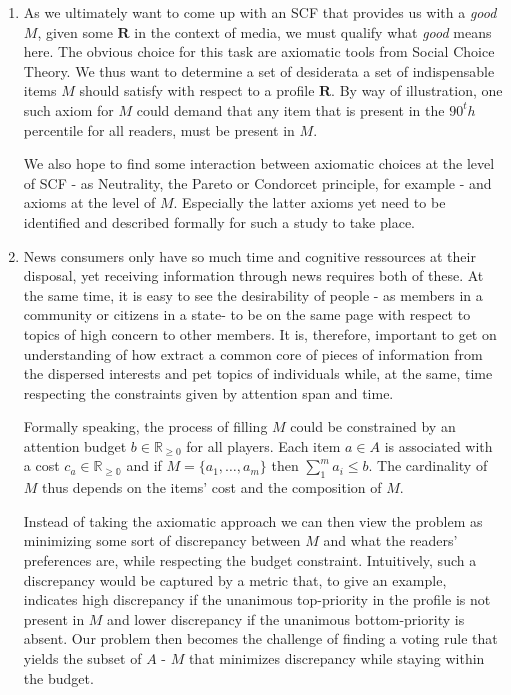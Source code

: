 \documentclass[10pt,a4paper, english]{article}
\begin{document}
\begin{enumerate}
\item As we ultimately want to come up with an SCF that provides us with a \textit{good} $M$, given some $\mathbf{R}$ in the context of media, we must qualify what \textit{good} means here. The obvious choice for this task are axiomatic tools from Social Choice Theory. We thus want to determine a set of desiderata a set of indispensable items $M$ should satisfy with respect to a profile $\mathbf{R}$. By way of illustration, one such axiom for $M$ could demand that any item that is present in the $90^th$ percentile for all readers, must be present in $M$.

We also hope to find some interaction between axiomatic choices at the level of SCF - as Neutrality, the Pareto or Condorcet principle, for example - and axioms at the level of $M$. Especially the latter axioms yet need to be identified and described formally for such a study to take place.
\item News consumers only have so much time and cognitive ressources at their disposal, yet receiving information through news requires both of these. At the same time, it is easy to see the desirability of people - as members in a community or citizens in a state- to be on the same page with respect to topics of high concern to other members. It is, therefore, important to get on understanding of how extract a common core of pieces of information from the dispersed interests and pet topics of individuals while, at the same, time respecting the constraints given by attention span and time. 

Formally speaking, the process of filling $M$ could be constrained by an attention budget $b\in \mathbb{R}_{\geq 0}$ for all players. Each item $a\in A$ is associated with a cost $c_a\in \mathbb{R_{\geq 0}}$ and if $M=\{a_1, \dots ,a_m\}$ then $\sum_1^m a_i \leq b$. The cardinality of $M$ thus depends on the items' cost and the composition of $M$.

Instead of taking the axiomatic approach we can then view the problem as minimizing some sort of discrepancy between $M$ and what the readers' preferences are, while respecting the budget constraint. Intuitively, such a discrepancy would be captured by a metric that, to give an example, indicates high discrepancy if the unanimous top-priority in the profile is not present in $M$ and lower discrepancy if the unanimous bottom-priority is absent. Our problem then becomes the challenge of finding a voting rule that yields the subset of $A$ - $M$ that minimizes discrepancy while staying within the budget.


\end{enumerate}
\end{document}
